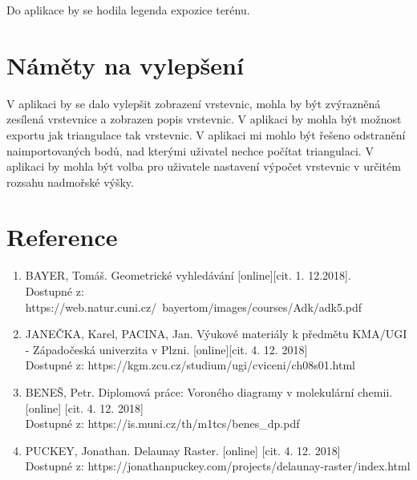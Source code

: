\documentclass[a4paper, 12pt]{article}
\begin{document}
Do aplikace by se hodila legenda expozice terénu.\\

\section{Náměty na vylepšení}
V aplikaci by se dalo vylepšit zobrazení vrstevnic, mohla by být zvýrazněná zesílená vrstevnice a zobrazen popis vrstevnic. 
V aplikaci by mohla být možnost exportu jak triangulace tak vrstevnic. 
V aplikaci mi mohlo být řešeno odstranění naimportovaných bodů, nad kterými uživatel nechce počítat triangulaci. 
V aplikaci by mohla být volba pro uživatele nastavení výpočet vrstevnic v určitém rozsahu nadmořské výšky.\\


\clearpage
\section{Reference}

\begin{enumerate}
\item  BAYER, Tomáš. Geometrické vyhledávání [online][cit. 1. 12.2018]. \\
Dostupné z: https://web.natur.cuni.cz/~bayertom/images/courses/Adk/adk5.pdf  \\

\item JANEČKA, Karel, PACINA, Jan. Výukové materiály k předmětu KMA/UGI - Západočeská univerzita v Plzni. [online][cit. 4. 12. 2018]\\
Dostupné z: https://kgm.zcu.cz/studium/ugi/cviceni/ch08s01.html\\

\item BENEŠ, Petr. Diplomová práce: Voroného diagramy v molekulární chemii. [online] [cit. 4. 12. 2018]\\
Dostupné z: https://is.muni.cz/th/m1tcs/benes\_dp.pdf \\

\item PUCKEY, Jonathan. Delaunay Raster. [online] [cit. 4. 12. 2018]\\
Dostupné z: https://jonathanpuckey.com/projects/delaunay-raster/index.html





\end{enumerate}
\end{document}
